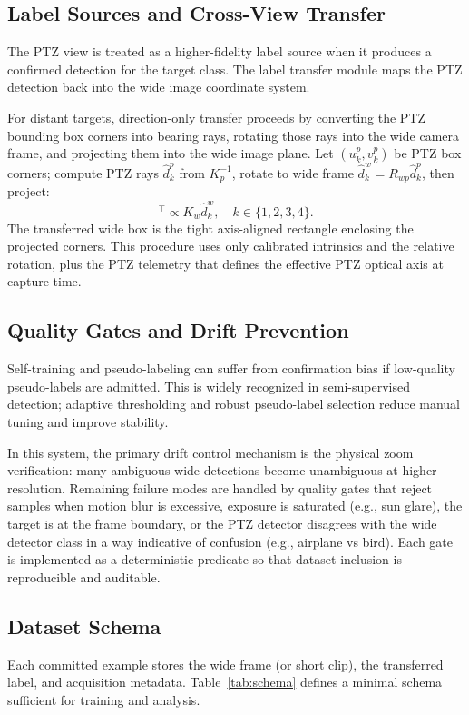 \documentclass[conf]{new-aiaa}
\begin{document}
{\subsection{Label Sources and Cross-View Transfer}
The PTZ view is treated as a higher-fidelity label source when it produces a confirmed detection for the target class. The label transfer module maps the PTZ detection back into the wide image coordinate system.
\par
For distant targets, direction-only transfer proceeds by converting the PTZ bounding box corners into bearing rays, rotating those rays into the wide camera frame, and projecting them into the wide image plane. Let $(u^p_k,v^p_k)$ be PTZ box corners; compute PTZ rays $\hat{d}^p_k$ from $K_p^{-1}$, rotate to wide frame $\hat{d}^w_k = R_{wp}\hat{d}^p_k$, then project:
\begin{equation}
[u^w_k, v^w_k, 1]^\top \propto K_w \hat{d}^w_k, \quad k \in \{1,2,3,4\}.
\end{equation}
The transferred wide box is the tight axis-aligned rectangle enclosing the projected corners. This procedure uses only calibrated intrinsics and the relative rotation, plus the PTZ telemetry that defines the effective PTZ optical axis at capture time.

\subsection{Quality Gates and Drift Prevention}
Self-training and pseudo-labeling can suffer from confirmation bias if low-quality pseudo-labels are admitted. This is widely recognized in semi-supervised detection; adaptive thresholding and robust pseudo-label selection reduce manual tuning and improve stability.
\par
In this system, the primary drift control mechanism is the physical zoom verification: many ambiguous wide detections become unambiguous at higher resolution. Remaining failure modes are handled by quality gates that reject samples when motion blur is excessive, exposure is saturated (e.g., sun glare), the target is at the frame boundary, or the PTZ detector disagrees with the wide detector class in a way indicative of confusion (e.g., airplane vs bird). Each gate is implemented as a deterministic predicate so that dataset inclusion is reproducible and auditable.



\subsection{Dataset Schema}
Each committed example stores the wide frame (or short clip), the transferred label, and acquisition metadata. Table~\ref{tab:schema} defines a minimal schema sufficient for training and analysis.

}
\end{document}
